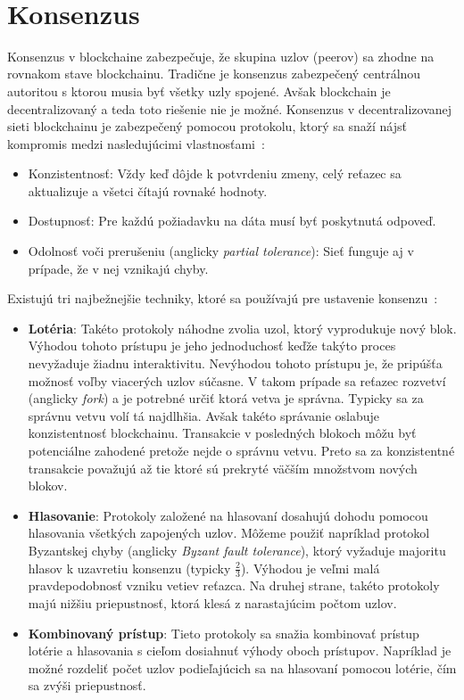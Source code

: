 ~\cite{narayanan2016bitcoin}

\section{Konsenzus}\label{sec:consenzus}
Konsenzus v blockchaine zabezpečuje, že skupina uzlov (peerov) sa  zhodne na rovnakom stave blockchainu. Tradične je konsenzus zabezpečený centrálnou autoritou s ktorou musia byť všetky uzly spojené. Avšak blockchain je decentralizovaný a teda toto riešenie nie je možné. Konsenzus v decentralizovanej sieti blockchainu je zabezpečený pomocou protokolu, ktorý sa snaží nájsť kompromis medzi nasledujúcimi vlastnosťami~\cite{gilbertCAP, zhangConsensus, leporeConsensus}:
\begin{itemize}
	\item Konzistentnosť: Vždy keď dôjde k potvrdeniu zmeny, celý reťazec sa aktualizuje a všetci čítajú rovnaké hodnoty.
	\item Dostupnosť: Pre každú požiadavku na dáta musí byť poskytnutá odpoveď.
	\item Odolnosť voči prerušeniu (anglicky \textit{partial tolerance}): Sieť funguje aj v prípade, že v nej vznikajú chyby.
\end{itemize}

Existujú tri najbežnejšie techniky, ktoré sa používajú pre ustavenie konsenzu~\cite{homoliakBlockchain}:
\begin{itemize}
	\item \textbf{Lotéria}: Takéto protokoly náhodne zvolia uzol, ktorý vyprodukuje nový blok. Výhodou tohoto prístupu je jeho jednoduchosť keďže takýto proces nevyžaduje žiadnu interaktivitu. Nevýhodou tohoto prístupu je, že pripúšťa možnosť voľby viacerých uzlov súčasne. V takom prípade sa reťazec rozvetví (anglicky \textit{fork}) a je potrebné určiť ktorá vetva je správna. Typicky sa za správnu vetvu volí tá najdlhšia. Avšak takéto správanie oslabuje konzistentnosť blockchainu. Transakcie v posledných blokoch môžu byť potenciálne zahodené pretože nejde o správnu vetvu. Preto sa za konzistentné transakcie považujú až tie ktoré sú prekryté väčším množstvom nových blokov.
	\item \textbf{Hlasovanie}: Protokoly založené na hlasovaní dosahujú dohodu pomocou hlasovania všetkých zapojených uzlov. Môžeme použiť napríklad protokol Byzantskej chyby (anglicky \textit{Byzant fault tolerance}), ktorý vyžaduje majoritu hlasov k uzavretiu konsenzu (typicky $\frac{2}{3}$). Výhodou je veľmi malá pravdepodobnosť vzniku vetiev reťazca. Na druhej strane, takéto protokoly majú nižšiu priepustnosť, ktorá klesá z narastajúcim počtom uzlov.
	\item \textbf{Kombinovaný prístup}: Tieto protokoly sa snažia kombinovať prístup lotérie a hlasovania s cieľom dosiahnuť výhody oboch prístupov. Napríklad je možné rozdeliť počet uzlov podieľajúcich sa na hlasovaní pomocou lotérie, čím sa zvýši priepustnosť.
\end{itemize}
~\cite{zhangConsensus, homoliakBlockchain}

